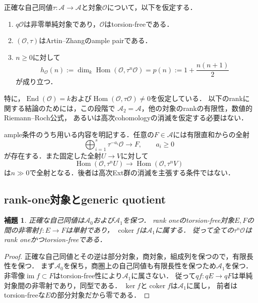 \documentclass[11pt,a4paper]{ltjsarticle}
\newtheorem{lemma}[theorem]{補題}
\theoremstyle{definition}
\newcommand{\OO}{\mathcal O}
\renewcommand{\AA}{\mathcal A}
\newcommand{\Hom}{\operatorname{Hom}}
\newcommand{\End}{\operatorname{End}}
\begin{document}
正確な自己同値$\tau:\AA\to\AA$と対象$\OO$について，以下を仮定する．
\begin{enumerate}
 \item $q\OO$は非零単純対象であり，$\OO$はtorsion-freeである．
 \item $(\OO,\tau)$はArtin--Zhangのample pairである．
 \item $n\geq0$に対して
 \begin{equation}\label{eq:rank-hilbert-input}
 h_{\OO}(n):=\dim_k\Hom(\OO,\tau^n\OO)
   =p(n):=1+\frac{n(n+1)}2
 \end{equation}
 が成り立つ．
\end{enumerate}
特に，$\End(\OO)=k$および$\Hom(\OO,\tau\OO)\ne0$を仮定している．
以下のrankに関する結論のためには，この段階で
$\AA_2=\AA$，他の対象のrankの有限性，数値的Riemann--Roch公式，
あるいは高次cohomologyの消滅を仮定する必要はない．

ample条件のうち用いる内容を明記する．任意の$F\in\AA$には有限直和からの全射
\begin{equation}\label{eq:rank-az-generation}
 \bigoplus_{i=1}^{s}\tau^{-a_i}\OO\longrightarrow F,
 \qquad a_i\geq0
\end{equation}
が存在する．また固定した全射$U\to V$に対して
\begin{equation}\label{eq:rank-az-surjectivity}
 \Hom(\OO,\tau^nU)\longrightarrow\Hom(\OO,\tau^nV)
\end{equation}
は$n\gg0$で全射となる．後者は高次Ext群の消滅を主張する条件ではない．

\subsection{rank-one対象とgeneric quotient}

\begin{lemma}\label{lem:rank-one-monomorphism}
正確な自己同値は$\AA_0$および$\AA_1$を保つ．
rank oneのtorsion-free対象$E,F$の間の非零射$f:E\to F$は単射であり，
$\operatorname{coker}f$は$\AA_1$に属する．
従って全ての$\tau^n\OO$はrank oneかつtorsion-freeである．
\end{lemma}

\begin{proof}
正確な自己同値とその逆は部分対象，商対象，組成列を保つので，有限長性を保つ．
まず$\AA_0$を保ち，商圏上の自己同値も有限長性を保つため$\AA_1$を保つ．
非零像$\operatorname{im}f\subset F$はtorsion-free性により$\AA_1$に属さない．
従って$qf:qE\to qF$は単純対象間の非零射であり，同型である．
$\ker f$と$\operatorname{coker}f$は$\AA_1$に属し，
前者はtorsion-freeな$E$の部分対象だから零である．
\end{proof}
\end{document}
